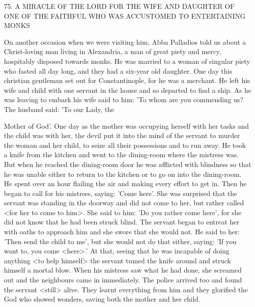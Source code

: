 75.
A MIRACLE OF THE LORD FOR THE WIFE
AND DAUGHTER OF ONE OF THE FAITHFUL WHO
WAS ACCUSTOMED TO ENTERTAINING MONKS

On another occasion when we were visiting him, Abba Palladios
told us about a Christ-loving man living in Alexandria, a man of
great piety and mercy, hospitably disposed towards monks.
He was
married to a woman of singular piety who fasted all day long, and
they had a six-year old daughter.
One day this christian gentleman
set out for Constantinople, for he was a merchant.
He left his wife
and child with one servant in the house and so departed to find a
ship.
As he was leaving to embark his wife said to him: 'To whom
are you commending us? The husband said: 'To our Lady, the

Mother of God'.
One day as the mother was occupying herself with
her tasks and the child was with her, the devil put it into the mind
of the servant to murder the woman and her child, to seize all their
possessions and to run away.
He took a knife from the kitchen and
went to the dining-room where the mistress was.
But when he
reached the dining-room door he was afflicted with blindness so that
he was unable either to return to the kitchen or to go on into the
dining-room.
He spent over an hour flailing the air and making
every effort to get in.
Then he began to call for his mistress, saying:
'Come here'.
She was surprised that the servant was standing in the
doorway and did not come to her, but rather called <for her to
come to him>.
She said to him: 'Do you rather come here', for she
did not know that he had been struck blind.
The servant began to
entreat her with oaths to approach him and she swore that she
would not.
He said to her: 'Then send the child to me', but she
would not do that either, saying: 'If you want to, you come
<here>.' At that, seeing that he was incapable of doing anything
<to help himself> the servant tumed the knife around and struck
himself a mortal blow.
When his mistress saw what he had done,
she screamed out and the neighbours came in immediately.
The
police arrived too and found the servant <still> alive.
They learnt
everything from him and they glorified the God who showed
wonders, saving both the mother and her child.

